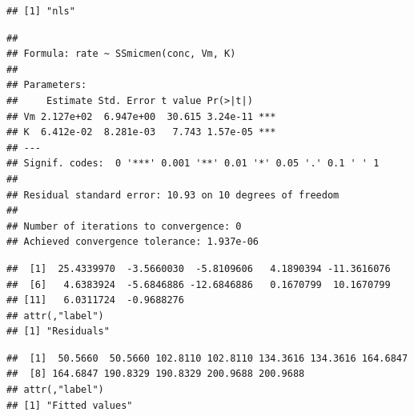 \documentclass[krantz2]{krantz}\usepackage{knitr}%
\begin{document}
\begin{knitrout}\footnotesize
{}\color{fgcolor}\begin{kframe}
\begin{alltt}
\end{alltt}
\begin{verbatim}
## [1] "nls"
\end{verbatim}
\begin{alltt}
\end{alltt}
\begin{verbatim}
## 
## Formula: rate ~ SSmicmen(conc, Vm, K)
## 
## Parameters:
##     Estimate Std. Error t value Pr(>|t|)    
## Vm 2.127e+02  6.947e+00  30.615 3.24e-11 ***
## K  6.412e-02  8.281e-03   7.743 1.57e-05 ***
## ---
## Signif. codes:  0 '***' 0.001 '**' 0.01 '*' 0.05 '.' 0.1 ' ' 1
## 
## Residual standard error: 10.93 on 10 degrees of freedom
## 
## Number of iterations to convergence: 0 
## Achieved convergence tolerance: 1.937e-06
\end{verbatim}
\begin{alltt}
\end{alltt}
\begin{verbatim}
##  [1]  25.4339970  -3.5660030  -5.8109606   4.1890394 -11.3616076
##  [6]   4.6383924  -5.6846886 -12.6846886   0.1670799  10.1670799
## [11]   6.0311724  -0.9688276
## attr(,"label")
## [1] "Residuals"
\end{verbatim}
\begin{alltt}
\end{alltt}
\begin{verbatim}
##  [1]  50.5660  50.5660 102.8110 102.8110 134.3616 134.3616 164.6847
##  [8] 164.6847 190.8329 190.8329 200.9688 200.9688
## attr(,"label")
## [1] "Fitted values"
\end{verbatim}
\end{kframe}
\end{knitrout}
\end{document}
